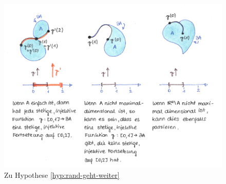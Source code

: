 %     
     \begin{figure}[ht]
        \centering
        \includegraphics[width=\textwidth]{abb/rand-geht-weiter.png}
        \caption{Zu Hypothese \ref{hyp:rand-geht-weiter}}
        \label{fig:rand-geht-weiter}
    \end{figure}
%
%
% 
% 
% 
%     
%
